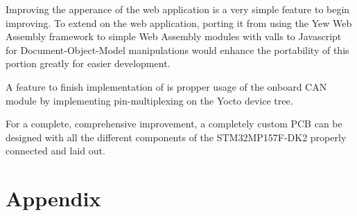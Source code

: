 \documentclass[12pt]{article}
\begin{document}
Improving the apperance of the web application is a very simple feature to begin
improving. To extend on the web application, porting it from using the Yew 
Web Assembly framework to simple Web Assembly modules with valls to Javascript 
for Document-Object-Model manipulations would enhance the portability of this portion
greatly for easier development.

A feature to finish implementation of is propper usage of the onboard CAN module 
by implementing pin-multiplexing on the Yocto device tree.

For a complete, comprehensive improvement, a completely custom PCB can be designed 
with all the different components of the STM32MP157F-DK2 properly connected
and laid out. 


\section{Appendix}
\end{document}
